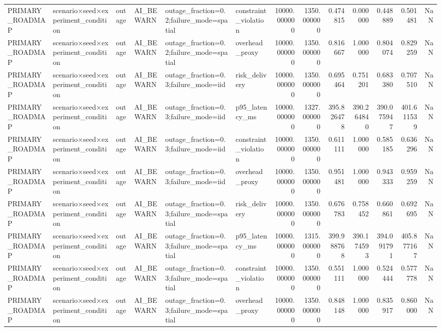 \begin{tabular}{llllllrrrrrrr}
PRIMARY\_ROADMAP & scenario×seed×experiment\_condition & outage & AI\_BEWARN & outage\_fraction=0.2;failure\_mode=spatial & constraint\_violation & 10000.000000 & 1350.000000 & 0.474815 & 0.000000 & 0.448889 & 0.501481 & NaN \\
PRIMARY\_ROADMAP & scenario×seed×experiment\_condition & outage & AI\_BEWARN & outage\_fraction=0.2;failure\_mode=spatial & overhead\_proxy & 10000.000000 & 1350.000000 & 0.816667 & 1.000000 & 0.804074 & 0.829259 & NaN \\
PRIMARY\_ROADMAP & scenario×seed×experiment\_condition & outage & AI\_BEWARN & outage\_fraction=0.3;failure\_mode=iid & risk\_delivery & 10000.000000 & 1350.000000 & 0.695464 & 0.751201 & 0.683380 & 0.707510 & NaN \\
PRIMARY\_ROADMAP & scenario×seed×experiment\_condition & outage & AI\_BEWARN & outage\_fraction=0.3;failure\_mode=iid & p95\_latency\_ms & 10000.000000 & 1327.000000 & 395.826478 & 390.264840 & 390.075947 & 401.611539 & NaN \\
PRIMARY\_ROADMAP & scenario×seed×experiment\_condition & outage & AI\_BEWARN & outage\_fraction=0.3;failure\_mode=iid & constraint\_violation & 10000.000000 & 1350.000000 & 0.611111 & 1.000000 & 0.585185 & 0.636296 & NaN \\
PRIMARY\_ROADMAP & scenario×seed×experiment\_condition & outage & AI\_BEWARN & outage\_fraction=0.3;failure\_mode=iid & overhead\_proxy & 10000.000000 & 1350.000000 & 0.951481 & 1.000000 & 0.943333 & 0.959259 & NaN \\
PRIMARY\_ROADMAP & scenario×seed×experiment\_condition & outage & AI\_BEWARN & outage\_fraction=0.3;failure\_mode=spatial & risk\_delivery & 10000.000000 & 1350.000000 & 0.676783 & 0.758452 & 0.660861 & 0.692695 & NaN \\
PRIMARY\_ROADMAP & scenario×seed×experiment\_condition & outage & AI\_BEWARN & outage\_fraction=0.3;failure\_mode=spatial & p95\_latency\_ms & 10000.000000 & 1315.000000 & 399.988768 & 390.174593 & 394.091791 & 405.877167 & NaN \\
PRIMARY\_ROADMAP & scenario×seed×experiment\_condition & outage & AI\_BEWARN & outage\_fraction=0.3;failure\_mode=spatial & constraint\_violation & 10000.000000 & 1350.000000 & 0.551111 & 1.000000 & 0.524444 & 0.577778 & NaN \\
PRIMARY\_ROADMAP & scenario×seed×experiment\_condition & outage & AI\_BEWARN & outage\_fraction=0.3;failure\_mode=spatial & overhead\_proxy & 10000.000000 & 1350.000000 & 0.848148 & 1.000000 & 0.835917 & 0.860000 & NaN \\

\end{tabular}
